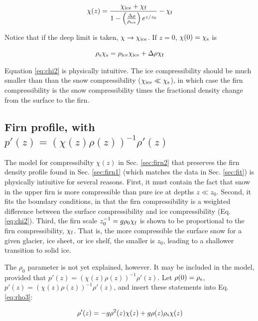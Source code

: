 \documentclass[12pt]{article}
\begin{document}
\begin{equation}
\chi(z) = \frac{\chi_{\rm ice}+\chi_{\rm f}}{1-\left(\frac{\Delta\rho}{\rho_{\rm ice}}\right)e^{z/z_0}}-\chi_{\rm f}
\label{eq:chi1}
\end{equation}

Notice that if the deep limit is taken, $\chi \to \chi_{\rm ice}$.  If $z = 0$, $\chi(0) = \chi_{\rm s}$ is

\begin{equation}
\rho_{\rm s} \chi_{\rm s} = \rho_{\rm ice}\chi_{\rm ice}+\Delta\rho\chi_{\rm f}
\label{eq:chi2}
\end{equation}

Equation \ref{eq:chi2} is physically intuitive.  The ice compressibility should be much smaller than than the snow compressibility ($\chi_{\rm ice} \ll \chi_{\rm s}$), in which case the firn compressibility is the snow compressibility times the fractional density change from the surface to the firn.

\subsection{Firn profile, with $p'(z) = (\chi(z)\rho(z))^{-1} \rho'(z)$}
\label{sec:firn3}
The model for compressibilty $\chi(z)$ in Sec. \ref{sec:firn2} that preserves the firn density profile found in Sec. \ref{sec:firn1} (which matches the data in Sec. \ref{sec:fit}) is physically intiuitive for several reasons.  First, it must contain the fact that snow in the upper firn is more compressible than pure ice at depths $z \ll z_0$.  Second, it fits the boundary conditions, in that the firn compressibility is a weighted difference between the surface compressibility and ice compressibility (Eq. \ref{eq:chi2}).  Third, the firn scale $z_0^{-1} = g\rho_0\chi_{\rm f}$ is shown to be proportional to the firn compressibility, $\chi_{\rm f}$.  That is, the more compressible the surface snow for a given glacier, ice sheet, or ice shelf, the smaller is $z_0$, leading to a shallower transition to solid ice.

The $\rho_0$ parameter is not yet explained, however.  It may be included in the model, provided that $p'(z) = (\chi(z)\rho(z))^{-1} \rho'(z)$.  Let $\rho(0) = \rho_{\rm s}$,  $p'(z) = (\chi(z)\rho(z))^{-1} \rho'(z)$, and insert these statements into Eq. \ref{eq:rho3}:

\begin{equation}
\rho'(z) = -g\rho^2(z)\chi(z) + g\rho(z)\rho_{\rm s}\chi(z)
\label{eq:chi3}
\end{equation}
\end{document}
